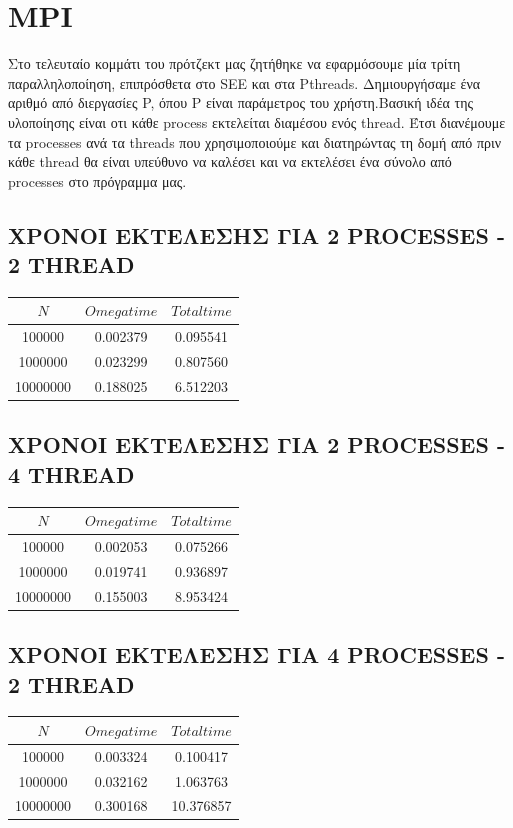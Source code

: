 \documentclass{FR16}
\begin{document}
\section{MPI}
Στο τελευταίο κομμάτι του πρότζεκτ μας ζητήθηκε να εφαρμόσουμε μία τρίτη παραλληλοποίηση, επιπρόσθετα στο SEE και στα Pthreads. Δημιουργήσαμε ένα αριθμό από διεργασίες P, όπου P είναι παράμετρος του χρήστη.Βασική ιδέα της υλοποίησης είναι οτι κάθε process εκτελείται διαμέσου ενός thread. Έτσι διανέμουμε τα processes ανά τα threads που χρησιμοποιούμε και διατηρώντας τη δομή από πριν κάθε thread θα είναι υπεύθυνο να καλέσει και να εκτελέσει ένα σύνολο από processes στο πρόγραμμα μας.

\subsection{ΧΡΟΝΟΙ ΕΚΤΕΛΕΣΗΣ ΓΙΑ 2 PROCESSES - 2 THREAD}
\begin{center}
\begin{tabular}{c c c}
\arrayrulecolor{Azzurro}
\hline
{\bfseries $Ν$} & {\bfseries $Omega time$} & {\bfseries $Total time$}\\
\hline
100000 & 0.002379 & 0.095541 \\
1000000 & 0.023299 & 0.807560 \\
10000000 & 0.188025 & 6.512203 \\
\hline
\end{tabular}
\end{center}

\subsection{ΧΡΟΝΟΙ ΕΚΤΕΛΕΣΗΣ ΓΙΑ 2 PROCESSES - 4 THREAD}
\begin{center}
\begin{tabular}{c c c}
\arrayrulecolor{Azzurro}
\hline
{\bfseries $Ν$} & {\bfseries $Omega time$} & {\bfseries $Total time$}\\
\hline
100000 & 0.002053 & 0.075266 \\
1000000 & 0.019741 & 0.936897 \\
10000000 & 0.155003 & 8.953424 \\
\hline
\end{tabular}
\end{center}

\subsection{ΧΡΟΝΟΙ ΕΚΤΕΛΕΣΗΣ ΓΙΑ 4 PROCESSES - 2 THREAD}
\begin{center}
\begin{tabular}{c c c}
\arrayrulecolor{Azzurro}
\hline
{\bfseries $Ν$} & {\bfseries $Omega time$} & {\bfseries $Total time$}\\
\hline
100000 & 0.003324 & 0.100417 \\
1000000 & 0.032162 & 1.063763 \\
10000000 & 0.300168 & 10.376857 \\
\hline
\end{tabular}
\end{center}
\end{document}
